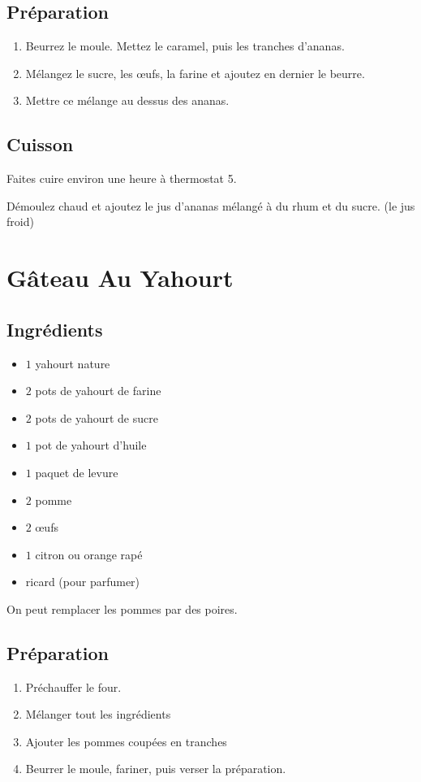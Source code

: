 \subsection*{Préparation}
\begin{enumerate}
\item Beurrez le moule. Mettez le caramel, puis les tranches d'ananas.
\item Mélangez le sucre, les œufs, la farine et ajoutez en dernier le beurre.
\item Mettre ce mélange au dessus des ananas.
\end{enumerate}

\subsection*{Cuisson}
Faites cuire environ une heure à thermostat 5.

Démoulez chaud et ajoutez le jus d'ananas mélangé à du rhum et du sucre. (le jus froid)


\newpage
\section{Gâteau Au Yahourt}
\subsection*{Ingrédients}

\begin{itemize}
\item $1$ yahourt nature
\item $2$ pots de yahourt de farine
\item $2$ pots de yahourt de sucre
\item $1$ pot de yahourt d'huile
\item $1$ paquet de levure
\item $2$ pomme
\item $2$ œufs
\item $1$ citron ou orange rapé
\item ricard (pour parfumer)
\end{itemize}

\begin{remarque}
On peut remplacer les pommes par des poires.
\end{remarque}

\subsection*{Préparation}
\begin{enumerate}
\item Préchauffer le four.
\item Mélanger tout les ingrédients
\item Ajouter les pommes coupées en tranches
\item Beurrer le moule, fariner, puis verser la préparation.
\end{enumerate}

